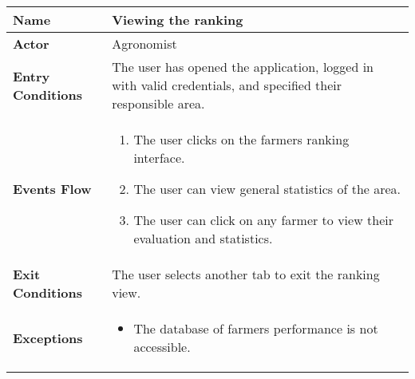 
\begin{center}
\begin{tabular}{|l|>{\raggedright\arraybackslash}m{12cm}|}

    \hline
    \textbf{Name} & Viewing the ranking\\
    \hline
   	\textbf{Actor} & Agronomist\\
    \hline
    
    \textbf{Entry Conditions} & The user has opened the application, logged in with valid credentials, and specified their responsible area. \\
    \hline
    \textbf{Events Flow} & \begin{enumerate}
            \item The user clicks on the farmers ranking interface.
            \item The user can view general statistics of the area.
            \item The user can click on any farmer to view their evaluation and statistics.
       \end{enumerate}\\
    \hline
    \textbf{Exit Conditions} & The user selects another tab to exit the ranking view.\\
    \hline
    \textbf{Exceptions} & 
       \begin{itemize}
          \item The database of farmers performance is not accessible.%
        \end{itemize}
     \\
    \hline
\end{tabular}
\end{center}
